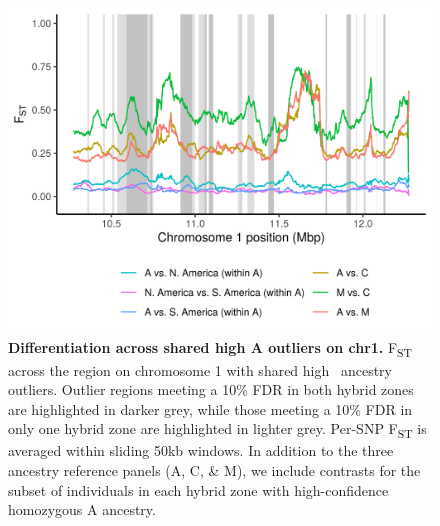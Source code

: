 \begin{figure}[ht]
\includegraphics[width = \textwidth]{chapter1/figures/Fst_across_chr1_outliers.png}
 \caption{ \textbf{Differentiation across shared high A outliers on chr1.} F\textsubscript{ST} across the region on chromosome 1 with shared high \A\ ancestry outliers. Outlier regions meeting a 10\% FDR in both hybrid zones are highlighted in darker grey, while those meeting a 10\% FDR in only one hybrid zone are highlighted in lighter grey. Per-SNP F\textsubscript{ST} is averaged within sliding 50kb windows. In addition to the three ancestry reference panels (A, C, \& M), we include contrasts for the subset of individuals in each hybrid zone with high-confidence homozygous A ancestry.}
\label{fst_chr1_A_outlier}
\end{figure}

